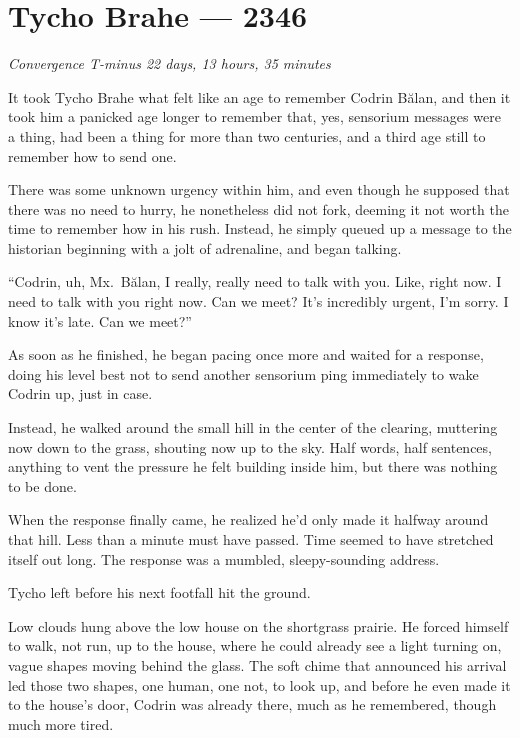 \hypertarget{tycho-brahe-2346}{%
\chapter{Tycho Brahe — 2346}}

\begin{center}
\emph{Convergence T-minus 22 days, 13 hours, 35 minutes}
\end{center}

\noindent It took Tycho Brahe what felt like an age to remember Codrin Bălan, and then it took him a panicked age longer to remember that, yes, sensorium messages were a thing, had been a thing for more than two centuries, and a third age still to remember how to send one.

There was some unknown urgency within him, and even though he supposed that there was no need to hurry, he nonetheless did not fork, deeming it not worth the time to remember how in his rush. Instead, he simply queued up a message to the historian beginning with a jolt of adrenaline, and began talking.

``Codrin, uh, Mx.~Bălan, I really, really need to talk with you. Like, right now. I need to talk with you right now. Can we meet? It's incredibly urgent, I'm sorry. I know it's late. Can we meet?''

As soon as he finished, he began pacing once more and waited for a response, doing his level best not to send another sensorium ping immediately to wake Codrin up, just in case.

Instead, he walked around the small hill in the center of the clearing, muttering now down to the grass, shouting now up to the sky. Half words, half sentences, anything to vent the pressure he felt building inside him, but there was nothing to be done.

When the response finally came, he realized he'd only made it halfway around that hill. Less than a minute must have passed. Time seemed to have stretched itself out long. The response was a mumbled, sleepy-sounding address.

Tycho left before his next footfall hit the ground.

Low clouds hung above the low house on the shortgrass prairie. He forced himself to walk, not run, up to the house, where he could already see a light turning on, vague shapes moving behind the glass. The soft chime that announced his arrival led those two shapes, one human, one not, to look up, and before he even made it to the house's door, Codrin was already there, much as he remembered, though much more tired.

